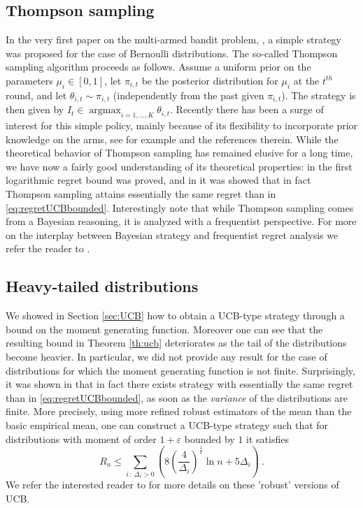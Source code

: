 \documentclass[11pt]{hackednow}
\renewcommand{\epsilon}{\varepsilon}
\newcommand{\argmax}{\mathop{\mathrm{argmax}}}
\begin{document}
\subsection{Thompson sampling}
In the very first paper on the multi-armed bandit problem, \cite{Tho33}, a simple strategy was proposed for the case of Bernoulli distributions. The so-called Thompson sampling algorithm proceeds as follows. Assume a uniform prior on the parameters $\mu_i \in [0,1]$, let $\pi_{i,t}$ be the posterior distribution for $\mu_i$ at the $t^{th}$ round, and let $\theta_{i,t} \sim \pi_{i,t}$ (independently from the past given $\pi_{i,t}$). The strategy is then given by $I_t \in \argmax_{i =1,\hdots, K} \theta_{i,t}$. Recently there has been a surge of interest for this simple policy, mainly because of its flexibility to incorporate prior knowledge on the arms, see for example \cite{CLi11} and the references therein. While the theoretical behavior of Thompson sampling has remained elusive for a long time, we have now a fairly good understanding of its theoretical properties: in \cite{AG12} the first logarithmic regret bound was proved, and in \cite{KKM12} it was showed that in fact Thompson sampling attains essentially the same regret than in \eqref{eq:regretUCBbounded}. Interestingly note that while Thompson sampling comes from a Bayesian reasoning, it is analyzed with a frequentist perspective. For more on the interplay between Bayesian strategy and frequentist regret analysis we refer the reader to \cite{KCG12}.

\subsection{Heavy-tailed distributions} \label{sec:heavytail}
We showed in Section \ref{sec:UCB} how to obtain a UCB-type strategy through a bound on the moment generating function. Moreover one can see that the resulting bound in Theorem \ref{th:ucb} deteriorates as the tail of the distributions become heavier. In particular, we did not provide any result for the case of distributions for which the moment generating function is not finite. Surprisingly, it was shown in \cite{BCL12} that in fact there exists strategy with essentially the same regret than in \eqref{eq:regretUCBbounded}, as soon as the {\em variance} of the distributions are finite. More precisely, using more refined robust estimators of the mean than the basic empirical mean, one can construct a UCB-type strategy such that for distributions with moment of order $1+\epsilon$ bounded by $1$ it satisfies
\[
R_n \leq \sum_{i \,:\, \Delta_i > 0} \left(8 \left(\frac{4}{\Delta_i}\right)^{\frac{1}{\epsilon}} \ln n + 5\Delta_i\right)~.
\]
We refer the interested reader to \cite{BCL12} for more details on these 'robust' versions of UCB.
\end{document}
